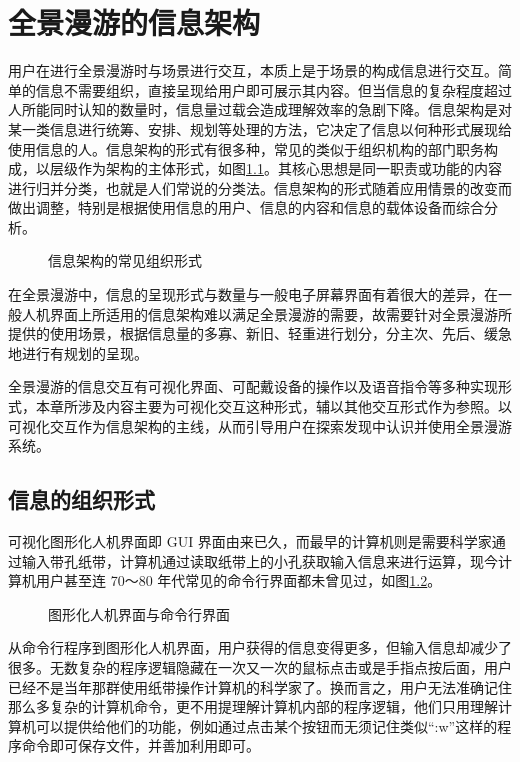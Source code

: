 \chapter{全景漫游的信息架构}

用户在进行全景漫游时与场景进行交互，本质上是于场景的构成信息进行交互。简单的信息不需要组织，直接呈现给用户即可展示其内容。但当信息的复杂程度超过人所能同时认知的数量时，信息量过载会造成理解效率的急剧下降。信息架构是对某一类信息进行统筹、安排、规划等处理的方法，它决定了信息以何种形式展现给使用信息的人。信息架构的形式有很多种，常见的类似于组织机构的部门职务构成，以层级作为架构的主体形式，如图\ref{fig:structure}。其核心思想是同一职责或功能的内容进行归并分类，也就是人们常说的分类法。信息架构的形式随着应用情景的改变而做出调整，特别是根据使用信息的用户、信息的内容和信息的载体设备而综合分析。

\begin{figure}[htp]
\centering
{}
\caption{信息架构的常见组织形式}
\label{fig:structure}
\end{figure}


在全景漫游中，信息的呈现形式与数量与一般电子屏幕界面有着很大的差异，在一般人机界面上所适用的信息架构难以满足全景漫游的需要，故需要针对全景漫游所提供的使用场景，根据信息量的多寡、新旧、轻重进行划分，分主次、先后、缓急地进行有规划的呈现。

全景漫游的信息交互有可视化界面、可配戴设备的操作以及语音指令等多种实现形式，本章所涉及内容主要为可视化交互这种形式，辅以其他交互形式作为参照。以可视化交互作为信息架构的主线，从而引导用户在探索发现中认识并使用全景漫游系统。

\section{信息的组织形式}
可视化图形化人机界面即 GUI 界面由来已久，而最早的计算机则是需要科学家通过输入带孔纸带，计算机通过读取纸带上的小孔获取输入信息来进行运算，现今计算机用户甚至连 70～80 年代常见的命令行界面都未曾见过，如图\ref{fig:gui&cli}。

\begin{figure}[htp]
\centering
{}
\caption{图形化人机界面与命令行界面}
\label{fig:gui&cli}
\end{figure}

从命令行程序到图形化人机界面，用户获得的信息变得更多，但输入信息却减少了很多。无数复杂的程序逻辑隐藏在一次又一次的鼠标点击或是手指点按后面，用户已经不是当年那群使用纸带操作计算机的科学家了。换而言之，用户无法准确记住那么多复杂的计算机命令，更不用提理解计算机内部的程序逻辑，他们只用理解计算机可以提供给他们的功能，例如通过点击某个按钮而无须记住类似“:w”这样的程序命令即可保存文件，并善加利用即可。

